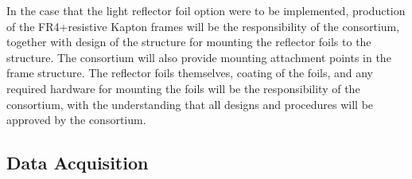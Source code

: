 In the case that the light reflector foil option were to be implemented, production of the FR4+resistive Kapton  frames will be the responsibility of the  consortium, together with design of the structure for mounting the  reflector foils to the  structure.  The  consortium will also provide mounting attachment points in the  frame structure.
 The reflector foils themselves,  coating of the  foils, and any required hardware for mounting the foils will be the responsibility of the  consortium, with the understanding that all designs and procedures will be approved by the  consortium. 



\subsection{Data Acquisition}
\label{sec:fdsp-pd-intfc-daq}




